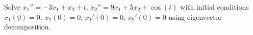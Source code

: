 \begin{exercise}
Solve
$x_1'' = -3x_1 + x_2 + t$, $x_2'' = 9x_1 + 5x_2
+\cos(t)$ with initial conditions
$x_1(0) = 0$, $x_2(0) = 0$,
$x_1'(0) = 0$, $x_2'(0) = 0$
using eigenvector decomposition.
\end{exercise}

